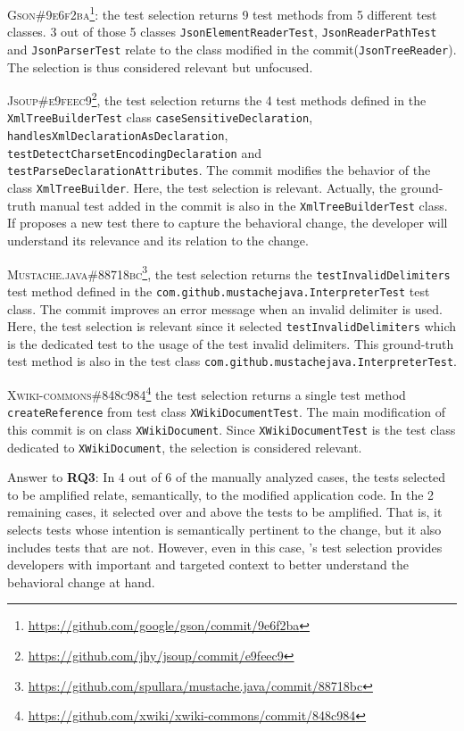 \textsc{Gson\#9e6f2ba}\footnote{\url{https://github.com/google/gson/commit/9e6f2ba}}: the test selection returns 9 test methods from 5 different test classes.
3 out of those 5 classes \texttt{JsonElementReaderTest}, \texttt{JsonReaderPathTest} and \texttt{JsonParserTest} relate to the class modified in the commit(\texttt{JsonTreeReader}).
The selection is thus considered relevant but unfocused.

\textsc{Jsoup\#e9feec9}\footnote{\url{https://github.com/jhy/jsoup/commit/e9feec9}}, the test selection returns the 4 test methods defined in the \texttt{XmlTreeBuilderTest} class \texttt{caseSensitiveDeclaration}, \texttt{handlesXmlDeclarationAsDeclaration}, \texttt{testDetectCharsetEncodingDeclaration} and \texttt{testParseDeclarationAttributes}.
The commit modifies the behavior of the class \texttt{XmlTreeBuilder}.
Here, the test selection is relevant.
Actually, the ground-truth manual test added in the commit is also in the \texttt{XmlTreeBuilderTest} class.
If \DCI proposes a new test there to capture the behavioral change, the developer will understand its relevance and its relation to the change.

\textsc{Mustache.java\#88718bc}\footnote{\url{https://github.com/spullara/mustache.java/commit/88718bc}}, the test selection returns the \texttt{testInvalidDelimiters} test method defined in the \texttt{com.github.mustachejava.InterpreterTest} test class.
The commit improves an error message when an invalid delimiter is used.
Here, the test selection is relevant since it selected \texttt{testInvalidDelimiters} which is the dedicated test to the usage of the test invalid delimiters.
This ground-truth test method is also in the test class \texttt{com.github.mustachejava.InterpreterTest}.

\textsc{Xwiki-commons\#848c984}\footnote{\url{https://github.com/xwiki/xwiki-commons/commit/848c984}} the test selection returns a single test method \texttt{createReference} from test class \texttt{XWikiDocumentTest}.
The main modification of this commit is on class \texttt{XWikiDocument}.
Since \texttt{XWikiDocumentTest} is the test class dedicated to \texttt{XWikiDocument}, the selection is considered relevant.

\begin{mdframed}[nobreak=true]
Answer to \textbf{RQ3}: 
In 4 out of 6 of the manually analyzed cases, the tests selected to be amplified relate, semantically, to the modified application code. 
In the 2 remaining cases, it selected over and above the tests to be amplified.
That is, it selects tests whose intention is semantically pertinent to the change, but it also includes tests that are not.
However, even in this case, \DCI's test selection provides developers with important and targeted context to better understand the behavioral change at hand.
\end{mdframed}


